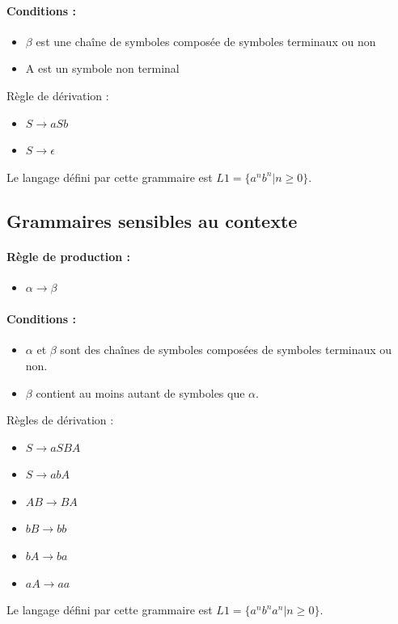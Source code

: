 \paragraph{Conditions :}

\begin{itemize}
	\item  $\beta$ est une chaîne de symboles composée de symboles terminaux
	       	ou non
	\item A est un symbole non terminal
\end{itemize}

\begin{myexem} Règle de dérivation :
\begin{itemize}
\item $S \rightarrow aSb$
\item $S \rightarrow \epsilon$
\end{itemize}
Le langage défini par cette grammaire est $L1 = \{a^nb^n|n\geq 0\}$.
\end{myexem}

\subsection{Grammaires sensibles au contexte}
\paragraph{Règle de production :}
\begin{itemize}
	\item $\alpha \rightarrow \beta$
\end{itemize}

\paragraph{Conditions :}
\begin{itemize}
	\item $\alpha$ et $\beta$ sont des chaînes de symboles composées de
		symboles terminaux ou non.
	\item $\beta$ contient au moins
		autant de symboles que $\alpha$.
\end{itemize}

\begin{myexem} Règles de dérivation :
\begin{itemize}
\item $S \rightarrow aSBA$
\item $S \rightarrow abA$
\item $AB \rightarrow BA$
\item $bB \rightarrow bb$
\item $bA \rightarrow ba$
\item $aA \rightarrow aa$
\end{itemize}
	Le langage défini par cette grammaire est $L1 =
	\{a^nb^na^n|n \geq 0\}$.
\end{myexem}


